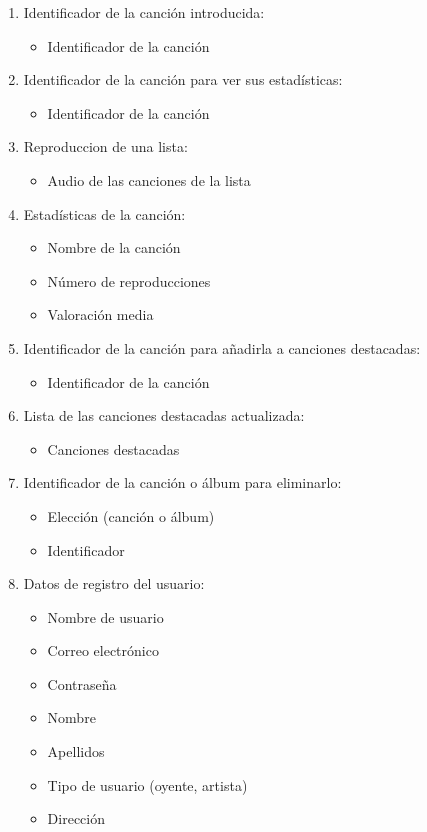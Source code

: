 \documentclass[12pt,a4paper]{article}
\begin{document}
\begin{enumerate}[label=\textnormal{RD\arabic*.}]
	\item  Identificador de la canción introducida: \label{rd12}
		\begin{itemize}
			\item Identificador de la canción
		\end{itemize}
		
	\item Identificador de la canción para ver sus estadísticas: \label{rd13}
		\begin{itemize}
			\item Identificador de la canción
		\end{itemize}
		
	\item Reproduccion de una lista: \label{rd14}
		\begin{itemize}
		   	\item Audio de las canciones de la lista
		\end{itemize}
		
	\item Estadísticas de la canción: \label{rd15}
		\begin{itemize}
		    \item Nombre de la canción
		    \item Número de reproducciones
		    \item Valoración media
		\end{itemize}
		
	\item Identificador de la canción para añadirla a canciones destacadas: \label{rd16}
		\begin{itemize}
			\item Identificador de la canción
		\end{itemize}
		
	\item Lista de las canciones destacadas actualizada: \label{rd17}
		\begin{itemize}
			\item Canciones destacadas
		\end{itemize}
		
	\item Identificador de la canción o álbum para eliminarlo: \label{rd18}
		\begin{itemize}
			\item Elección (canción o álbum)
			\item Identificador
		\end{itemize}
		
	\item Datos de registro del usuario: \label{rd19}
		\begin{itemize}
			\item Nombre de usuario
			\item Correo electrónico
			\item Contraseña
			\item Nombre
			\item Apellidos
			\item Tipo de usuario (oyente, artista)
			\item Dirección
		\end{itemize}
		

\end{enumerate}
\end{document}
